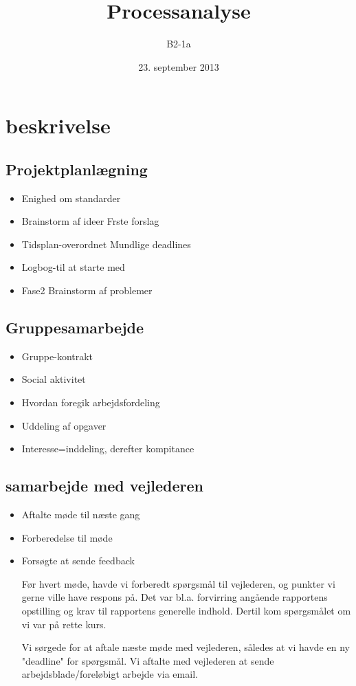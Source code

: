 


\title{Processanalyse}
\author{B2-1a}
\date{23. september 2013}
\maketitle

\section{beskrivelse}

\subsection{Projektplanlægning}
\begin{itemize}
\item Enighed om standarder
\item Brainstorm af ideer
\subitem Frste forslag
\item Tidsplan-overordnet
\subitem Mundlige deadlines
\item Logbog-til at starte med
\item Fase2 Brainstorm af problemer
\end{itemize}

\subsection{Gruppesamarbejde}

\begin{itemize}
\item Gruppe-kontrakt
\item Social aktivitet
\item Hvordan  foregik arbejdsfordeling
\item Uddeling af opgaver
\item Interesse=inddeling, derefter kompitance
\end{itemize}

\subsection{samarbejde med vejlederen}

\begin{itemize}
\item Aftalte møde til næste gang
\item Forberedelse til møde
\item Forsøgte at sende feedback

Før hvert møde, havde vi forberedt spørgsmål til vejlederen, og punkter vi gerne ville have respons på. Det var bl.a. forvirring angående rapportens opstilling og krav til rapportens generelle indhold. Dertil kom spørgsmålet om vi var på rette kurs.

Vi sørgede for at aftale næste møde med vejlederen, således at vi havde en ny "deadline" for spørgsmål. Vi aftalte med vejlederen at sende arbejdsblade/foreløbigt arbejde via email.

\end{itemize}

